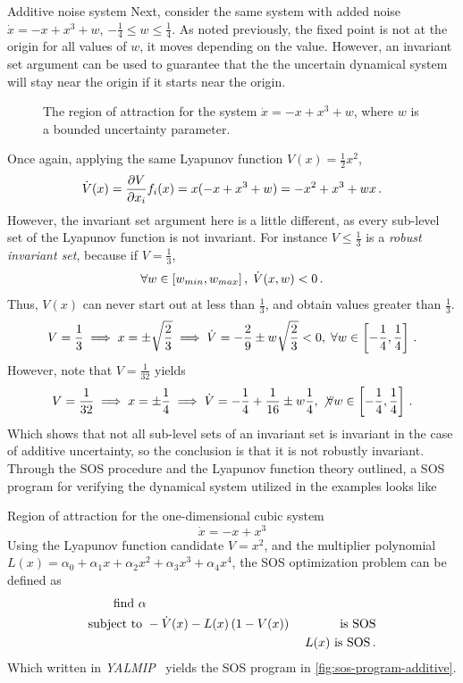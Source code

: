 \begin{example}{Additive noise system}
  Next, consider the same system with added noise \(\dot{x} = -x + x^3 + w\),
  \(-\frac{1}{4} \leq w \leq \frac{1}{4}\). As noted previously, the fixed point
  is not at the origin for all values of \(w\), it moves depending on the value.
  However, an invariant set argument can be used to guarantee that the the
  uncertain dynamical system will stay near the origin if it starts near the
  origin.
\end{example}

\begin{figure}
  \centering
  
  \caption[The region of attraction for the system \(\dot{x} = -x + x^3 + w\)]{The region of attraction for the system \(\dot{x} = -x + x^3 + w\),
    where \(w\) is a bounded uncertainty parameter.}
\end{figure}

Once again, applying the same Lyapunov function \(V(x) = \frac{1}{2}x^2\),
\[
  \dot{V}(x) = \frac{\partial V}{\partial x_i} f_i(x) = x(-x + x^3 + w) = -x^2 +
  x^3 + wx \, .
\]
However, the invariant set argument here is a little different, as every
sub-level set of the Lyapunov function is not invariant. For instance \(V \leq
\frac{1}{3}\) is a \textit{robust invariant set}, because if \(V =
\frac{1}{3}\),
\[
  \forall w \in \left[ w_{min}, w_{max} \right], \; \dot{V}(x,w) < 0 \, .
\]
Thus, \(V(x)\) can never start out at less than \(\frac{1}{3}\), and obtain
values greater than \(\frac{1}{3}\).
\[
  V = \frac{1}{3} \implies x = \pm \sqrt{\frac{2}{3}} \implies \dot{V} =
  -\frac{2}{9} \pm w \sqrt{\frac{2}{3}} < 0, \; \forall w \in \left[
    -\frac{1}{4}, \frac{1}{4} \right] \, .
\]
However, note that \(V = \frac{1}{32}\) yields
\[
  V = \frac{1}{32} \implies x = \pm \frac{1}{4} \implies \dot{V} = -\frac{1}{4}
  + \frac{1}{16} \pm w\frac{1}{4}, \; \not \forall w \in \left[ -\frac{1}{4},
    \frac{1}{4} \right] \, .
\]
Which shows that not all sub-level sets of an invariant set is invariant in the
case of additive uncertainty, so the conclusion is that it is not robustly
invariant. Through the \ac{SOS} procedure and the Lyapunov function theory
outlined, a \ac{SOS} program for verifying the dynamical system utilized in the
examples looks like

\begin{example}{Region of attraction for the one-dimensional cubic system}
  \[
    \dot{x} = -x + x^3
  \]
  Using the Lyapunov function candidate \(V = x^2\), and the multiplier
  polynomial \(L(x) = \alpha_0 + \alpha_1x + \alpha_2x^2 + \alpha_3x^3 +
  \alpha_4x^4\), the \ac{SOS} optimization problem can be defined as
  \begin{align*}
    \text{find } \alpha& \\
    \text{subject to }& -\dot{V}(x) - L(x)\left( 1 - V(x) \right) \; &\text{is SOS} \\
                       & &L(x) \text{ is SOS} \, .
  \end{align*}
  Which written in \textit{YALMIP}~\cite{Lofberg2004,Lofberg2009} yields the
  \ac{SOS} program in \cref{fig:sos-program-additive}.
\end{example}

